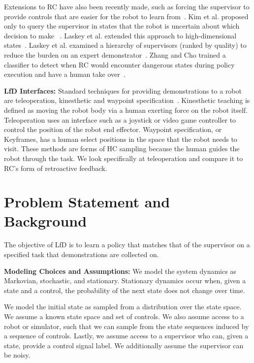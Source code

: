 \documentclass[10pt, conference]{ieeeconf}      %
\newcommand{\nc}{RC }
\begin{document}
Extensions to \nc have also been recently made, such as forcing the supervisor to provide controls that are easier for the robot to learn from~\cite{he2012imitation}.  Kim et al. proposed only to query the supervisor in states that the robot is uncertain about which decision to make~\cite{kim2013maximum} . Laskey et al. extended this approach to high-dimensional states~\cite{laskeyshiv}. Laskey et al. examined a hierarchy of supervisors (ranked by quality)  to reduce the burden on an expert demonstrator~\cite{laskeyrobot}. Zhang and Cho trained a classifier to detect when \nc would encounter dangerous states during policy execution and have a human take over~\cite{zhang2016query}.

\textbf{LfD Interfaces:}
Standard techniques for providing demonstrations to a robot are teleoperation, kinesthetic and waypoint specification~\cite{akgun2012keyframe,akgun2012novel,argall2009survey}. Kinesthetic teaching is defined as moving the robot body via a human exerting force on the robot itself. Teleoperation uses an interface such as a joystick or video game controller to control the position of the robot end effector. Waypoint specification, or Keyframes, has a human select positions in the space that the robot needs to visit. These methods are forms of HC sampling because the human guides the robot through the task.  We look specifically at teleoperation and compare it to RC's form of retroactive feedback. 

\section{Problem Statement and Background}\label{sec:PS}
The objective of LfD is to learn a policy that matches that of the supervisor on a specified task that demonstrations are collected on.

\noindent\textbf{Modeling Choices and Assumptions:}  We model the system dynamics as Markovian, stochastic, and stationary. Stationary dynamics occur when, given a state and a control, the probability of the next state does not change over time. 

We model the initial state as sampled from a distribution over the state space.
We assume a known state space and set of controls. We also assume access to a robot or simulator, such that we  can sample from the state sequences induced by a sequence of controls.
Lastly, we assume access to a supervisor who can, given a state, provide a control signal label.
We additionally assume the supervisor can be noisy. 
\end{document}
